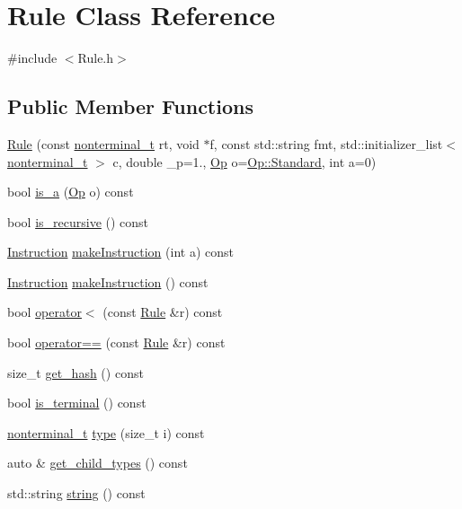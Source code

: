 \hypertarget{class_rule}{}\section{Rule Class Reference}
\label{class_rule}


{\ttfamily \#include $<$Rule.\+h$>$}

\subsection*{Public Member Functions}
\begin{DoxyCompactItemize}
\item 
\hyperlink{class_rule_a5f4f42aca271d749e2e217188bb481d6}{Rule} (const \hyperlink{_nonterminal_8h_a1c5bfe9b903f69c83bbde5da7035fef3}{nonterminal\+\_\+t} rt, void $\ast$f, const std\+::string fmt, std\+::initializer\+\_\+list$<$ \hyperlink{_nonterminal_8h_a1c5bfe9b903f69c83bbde5da7035fef3}{nonterminal\+\_\+t} $>$ c, double \+\_\+p=1., \hyperlink{_ops_8h_a588e6b56097e045c733b60d25c4d45ab}{Op} o=\hyperlink{_ops_8h_a588e6b56097e045c733b60d25c4d45abaeb6d8ae6f20283755b339c0dc273988b}{Op\+::\+Standard}, int a=0)
\item 
bool \hyperlink{class_rule_abdf29814185995dbdc09b4d62658da2e}{is\+\_\+a} (\hyperlink{_ops_8h_a588e6b56097e045c733b60d25c4d45ab}{Op} o) const
\item 
bool \hyperlink{class_rule_a190786a2f5ab452ac0a557c44b8790ed}{is\+\_\+recursive} () const
\item 
\hyperlink{struct_instruction}{Instruction} \hyperlink{class_rule_a87d9e666dd70af3b4a8df2e2411cbe32}{make\+Instruction} (int a) const
\item 
\hyperlink{struct_instruction}{Instruction} \hyperlink{class_rule_a6518d9c0da87dade8e8620dea94506ab}{make\+Instruction} () const
\item 
bool \hyperlink{class_rule_a706819fbede2c5a1b0b59f1d28cae30b}{operator$<$} (const \hyperlink{class_rule}{Rule} \&r) const
\item 
bool \hyperlink{class_rule_a183fafc8a6b43515436a1de8f63ec98d}{operator==} (const \hyperlink{class_rule}{Rule} \&r) const
\item 
size\+\_\+t \hyperlink{class_rule_a62e4d931266a65d4aad9ca3c058d7e25}{get\+\_\+hash} () const
\item 
bool \hyperlink{class_rule_a9d557e302f94bd85f5505733e8856f97}{is\+\_\+terminal} () const
\item 
\hyperlink{_nonterminal_8h_a1c5bfe9b903f69c83bbde5da7035fef3}{nonterminal\+\_\+t} \hyperlink{class_rule_a97db8e22bb8445b92779eb165bb29ae5}{type} (size\+\_\+t i) const
\item 
auto \& \hyperlink{class_rule_a0688b2f904b086d51972abf3c09602c5}{get\+\_\+child\+\_\+types} () const
\item 
std\+::string \hyperlink{class_rule_a7f16256eabd7bd8b94fbcf857bf1e45b}{string} () const
\end{DoxyCompactItemize}
